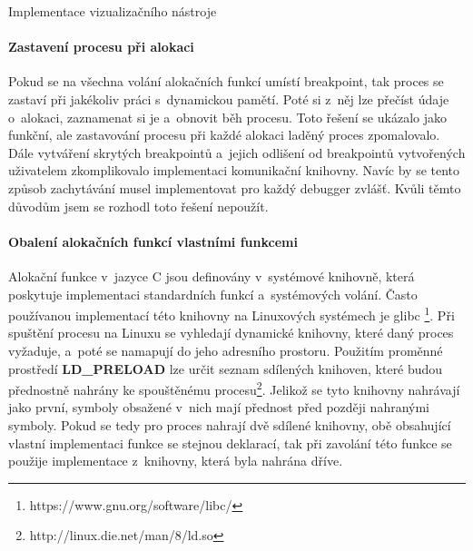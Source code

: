 \documentclass[czech,bachelor,male,python,dept460,hidelinks]{diploma}						%
\begin{document}
\begin{section}{Implementace vizualizačního nástroje}
				\paragraph*{Zastavení procesu při alokaci} Pokud se na všechna volání alokačních funkcí umístí breakpoint, tak proces se zastaví při jakékoliv práci
				s~dynamickou pamětí. Poté si z~něj lze přečíst údaje o~alokaci, zaznamenat si je a~obnovit běh procesu. Toto řešení se ukázalo jako funkční,
				ale zastavování procesu při každé alokaci laděný proces zpomalovalo. Dále vytváření skrytých breakpointů a~jejich odlišení od breakpointů vytvořených
				uživatelem zkomplikovalo implementaci komunikační knihovny. Navíc by se tento způsob zachytávání musel
				implementovat pro každý debugger zvlášť. Kvůli těmto důvodům jsem se rozhodl toto řešení nepoužít.
				
				\paragraph*{Obalení alokačních funkcí vlastními funkcemi} Alokační funkce v~jazyce C jsou definovány v~systémové knihovně, která poskytuje
				implementaci standardních funkcí a~systémových volání. Často používanou implementací této knihovny na Linuxových systémech je glibc
				\footnote{https://www.gnu.org/software/libc/}. Při spuštění procesu na Linuxu se vyhledají dynamické knihovny, které daný proces vyžaduje,
				a~poté se namapují do jeho adresního prostoru. Použitím proměnné prostředí \textbf{LD\_PRELOAD} lze určit
				seznam sdílených knihoven, které budou přednostně nahrány ke spouštěnému procesu\footnote{http://linux.die.net/man/8/ld.so}.
				Jelikož se tyto knihovny nahrávají jako první, symboly obsažené v~nich mají přednost před později nahranými symboly. Pokud se tedy pro proces
				nahrají dvě sdílené knihovny, obě obsahující vlastní implementaci funkce se stejnou deklarací, tak při zavolání této funkce se použije
				implementace z~knihovny, která byla nahrána dříve.
				

\end{section}
\end{document}
